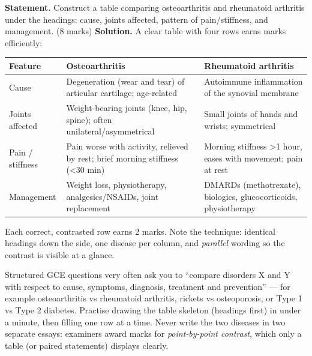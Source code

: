 \documentclass[11pt]{article}
\begin{document}
\begin{exoresolu}
\textbf{Statement.} Construct a table comparing osteoarthritis and rheumatoid arthritis under the headings: cause, joints affected, pattern of pain/stiffness, and management. (8 marks)
\tcblower
\textbf{Solution.} A clear table with four rows earns marks efficiently:

\begin{center}
\begin{tabularx}{\linewidth}{|l|X|X|}
\hline
\rowcolor{popblueL} \textbf{Feature} & \textbf{Osteoarthritis} & \textbf{Rheumatoid arthritis} \\
\hline
Cause & Degeneration (wear and tear) of articular cartilage; age-related & Autoimmune inflammation of the synovial membrane \\
\hline
Joints affected & Weight-bearing joints (knee, hip, spine); often unilateral/asymmetrical & Small joints of hands and wrists; symmetrical \\
\hline
Pain / stiffness & Pain worse with activity, relieved by rest; brief morning stiffness (<30 min) & Morning stiffness >1 hour, eases with movement; pain at rest \\
\hline
Management & Weight loss, physiotherapy, analgesics/NSAIDs, joint replacement & DMARDs (methotrexate), biologics, glucocorticoids, physiotherapy \\
\hline
\end{tabularx}
\end{center}

Each correct, contrasted row earns 2 marks. Note the technique: identical headings down the side, one disease per column, and \emph{parallel} wording so the contrast is visible at a glance.
\end{exoresolu}

\begin{attention}
Structured GCE questions very often ask you to ``compare disorders X and Y with respect to cause, symptoms, diagnosis, treatment and prevention'' — for example osteoarthritis vs rheumatoid arthritis, rickets vs osteoporosis, or Type 1 vs Type 2 diabetes. Practise drawing the table skeleton (headings first) in under a minute, then filling one row at a time. Never write the two diseases in two separate essays: examiners award marks for \emph{point-by-point contrast}, which only a table (or paired statements) displays clearly.
\end{attention}
\end{document}
